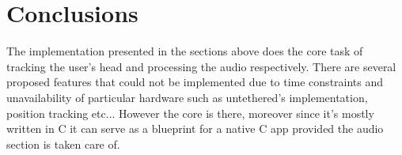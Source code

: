 \documentclass[a4paper,12pt,oneside]{article}
\begin{document}
\section{Conclusions}

The implementation presented in the sections above does the core task of tracking the user's head and processing the audio respectively. There are several proposed features that could not be implemented due to time constraints and unavailability of particular hardware such as untethered's implementation, position tracking etc... However the core is there, moreover since it's mostly written in C it can serve as a blueprint for a native C app provided the audio section is taken care of.  
    
  \newpage
  
  
  
  
  
\end{document}

